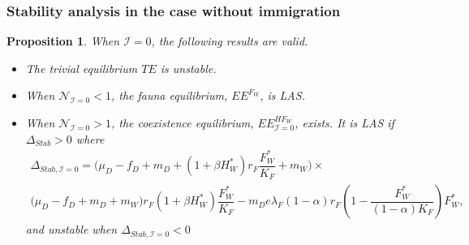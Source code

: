 \documentclass{article}
\newcommand{\lfw}{\lambda_{F}}
\newcommand{\lfw}{\lambda_{F}}
\newcommand{\cI}{\mathcal{I}}
\newtheorem{prop}{Proposition}
\begin{document}
\subsubsection{Stability analysis in the case without immigration}
\begin{prop}\label{prop:stab, cI=0} When $\cI = 0$, the following results are valid.
\begin{itemize}
\item The trivial equilibrium $TE$ is unstable.
\item When $\mathcal{N}_{\cI = 0} < 1$, the fauna equilibrium, $EE^{F_W}$, is LAS.
\item When $\mathcal{N}_{\cI = 0} > 1$, the coexistence equilibrium, $EE^{HF_W}_{\cI =0}$, exists. It is LAS if $\Delta_{Stab} > 0$ where 
\begin{multline*}
\Delta_{Stab, \cI =0} = \Big(\mu_D - f_D + m_D + (1+\beta H_W^*)r_F \dfrac{F_W^*}{K_F} + m_W\Big) \times \\ \big( \mu_D  -f_D + m_D + m_W \big) r_F(1+ \beta H_W^*) \dfrac{F^*_W}{K_F} - 
m_D e \lfw (1- \alpha) r_F \left(1 - \dfrac{F_W^*}{(1- \alpha)K_F}\right) F_W^*,
\end{multline*}
and unstable when $\Delta_{Stab, \cI =0} < 0$
\end{itemize}
\end{prop}
\end{document}
